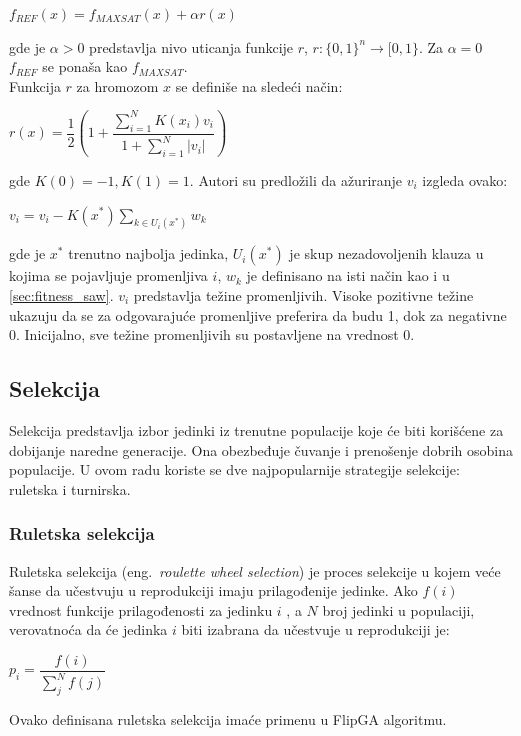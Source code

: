 \documentclass[a4paper]{article}
\begin{document}
\begin{center}
	$ f_{REF} (x) = f_{MAXSAT} (x) + \alpha r(x) $
\end{center}
gde je $\alpha > 0 $ predstavlja nivo uticanja funkcije $r$, 
$ r : \lbrace 0, 1 \rbrace ^ n \rightarrow [0, 1 \rbrace $. 
Za $\alpha = 0 $ $f_{REF} $ se ponaša kao $f_{MAXSAT} $. \\

Funkcija $r$ za hromozom $x$ se definiše na sledeći način:

\begin{center}
$r(x) = \dfrac{1}{2} ( 1 + \dfrac{\sum_{i=1}^{N} K(x_i) v_i} {1+ \sum_{i=1}^{N} |v_i|})$
\end{center}
gde  $ K(0) = -1, K(1) = 1 $. Autori su predložili da ažuriranje $v_i$  izgleda ovako:
 
\begin{center}
	$ v_i = v_i - K(x^*) \sum_{k \in U_i(x^*)} w_k $
\end{center}
gde je $x^*$ trenutno najbolja jedinka, $U_i (x^*)$ je skup nezadovoljenih klauza 
u kojima se pojavljuje promenljiva $i$, $w_k$ je definisano na isti način kao i u
\ref{sec:fitness_saw}. $v_i$ predstavlja težine promenljivih. Visoke pozitivne težine 
ukazuju da se za odgovarajuće promenljive preferira da budu 1, dok za negativne 0. 
Inicijalno, sve težine promenljivih su postavljene na vrednost 0.


\subsection{Selekcija}
\label{sec:ea_selekcija}
Selekcija predstavlja izbor jedinki iz trenutne populacije koje će biti korišćene za dobijanje
naredne generacije. Ona obezbeđuje čuvanje i prenošenje dobrih osobina populacije. 
U ovom radu koriste se dve najpopularnije strategije selekcije: ruletska i turnirska.

\subsubsection{Ruletska selekcija}
\label{sec:ea_ruletska}
Ruletska selekcija (eng.~{\em roulette wheel selection}) \cite{vi_Janicic} je proces 
selekcije u kojem veće šanse da učestvuju u reprodukciji imaju prilagođenije jedinke.
Ako $f(i)$ vrednost funkcije prilagođenosti za jedinku $i$ , a $N$ broj jedinki u populaciji,
verovatnoća da će jedinka $i$ biti izabrana da učestvuje u reprodukciji je:

\begin{center}
$p_i = \dfrac{f(i)}{\sum_{j}^{N} f(j)} $
\end{center}
Ovako definisana ruletska selekcija imaće primenu u FlipGA algoritmu.
\end{document}
